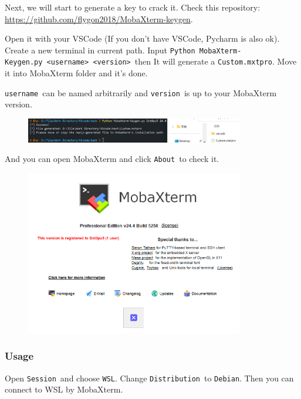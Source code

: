 \documentclass[12pt]{ctexart}
\begin{document}
Next, we will start to generate a key to crack it. Check this
repository: \url{https://github.com/flygon2018/MobaXterm-keygen}.

Open it with your VSCode (If you don't have VSCode,
Pycharm is also ok). Create a new terminal in current path. Input
\texttt{Python\ MobaXterm-Keygen.py\ \textless{}username\textgreater{}\ \textless{}version\textgreater{}}\
then It will generate a \texttt{Custom.mxtpro}. Move it into MobaXterm
folder and it's done.

\texttt{username}\ can be named arbitrarily and \texttt{version}\ is up to
your MobaXterm version.

\begin{figure}[H]
    \centering
    \includegraphics[width=0.85\textwidth,keepaspectratio]{assets/Linux/2.2 MobaXterm, go ssh it!/2.png}
\end{figure}

And you can open MobaXterm and click \texttt{About}\ to check it.

\begin{figure}[H]
    \centering
    \includegraphics[width=0.85\textwidth,keepaspectratio]{assets/Linux/2.2 MobaXterm, go ssh it!/3.png}
\end{figure}

\subsubsection{\textbf{Usage}}

Open \texttt{Session}\ and choose \texttt{WSL}. Change
\texttt{Distribution}\ to \texttt{Debian}. Then you can connect to WSL by
MobaXterm.
\end{document}
